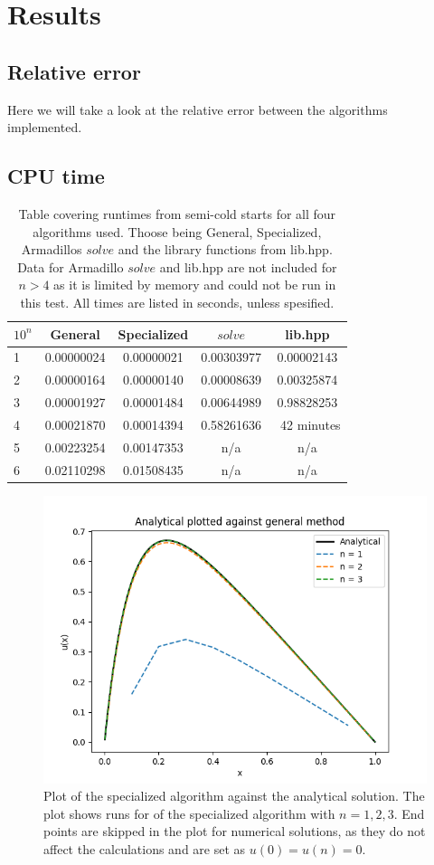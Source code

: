 \documentclass[10pt, a4paper]{amsart}
\begin{document}
\section{Results}
\subsection{Relative error}
Here we will take a look at the relative error between the algorithms implemented. 
\subsection{CPU time}
\begin{table}[h]
\caption{Table covering runtimes from semi-cold starts for all four algorithms used. Thoose being General, Specialized, Armadillos $solve$ and the library functions from lib.hpp. Data for Armadillo $solve$ and lib.hpp are not included for $n>4$ as it is limited by memory and could not be run in this test. All times are listed in seconds, unless spesified.}
\begin{tabular}{lcccc}
\hline
 $10^n$ & General & Specialized & $solve$ & lib.hpp \\ \hline
 1 & 0.00000024 & 0.00000021 & 0.00303977 & 0.00002143 \\
 2 & 0.00000164 & 0.00000140 & 0.00008639 & 0.00325874\\
 3 & 0.00001927 & 0.00001484 & 0.00644989 & 0.98828253\\
 4 & 0.00021870 & 0.00014394 & 0.58261636 & ~42 minutes\\
 5 & 0.00223254 & 0.00147353 & n/a & n/a\\
 6 & 0.02110298 & 0.01508435 & n/a & n/a 
 \end{tabular}
\label{tab:solver_times}
\end{table}

\begin{figure}[h]
 \centering
 \includegraphics[width=0.9\linewidth]{../code/plots/plot_general.png}
 \caption{Plot of the specialized algorithm against the analytical solution. The plot shows runs for of the specialized algorithm with $n = 1, 2, 3$. End points are skipped in the plot for numerical solutions, as they do not affect the calculations and are set as $u(0) = u(n) = 0$.}
 \label{fig:special}
\end{figure}
\end{document}
